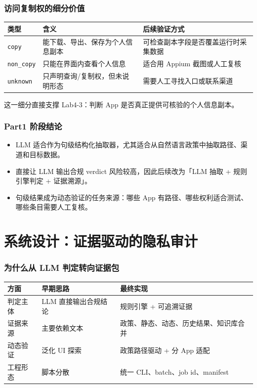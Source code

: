 \documentclass[AutoFakeBold,AutoFakeSlant]{beamer}
\newcommand{\code}[1]{\texttt{#1}}
\begin{document}
\begin{frame}
    \frametitle{访问复制权的细分价值}
    \small
    \begin{tabularx}{\textwidth}{|l|X|X|}
        \hline
        \textbf{类型} & \textbf{含义} & \textbf{后续验证方式} \\
        \hline
        \code{copy} & 能下载、导出、保存为个人信息副本 & 可检查副本字段是否覆盖运行时采集数据 \\
        \hline
        \code{non\_copy} & 只能在界面内查看个人信息 & 适合用 Appium 截图或人工复核 \\
        \hline
        \code{unknown} & 只声明查询/复制权，但未说明形态 & 需要人工寻找入口或联系渠道 \\
        \hline
    \end{tabularx}
    \vspace{0.6em}
    \scriptsize
    这一细分直接支撑 Lab4-3：判断 App 是否真正提供可核验的个人信息副本。
\end{frame}

\begin{frame}
    \frametitle{Part1 阶段结论}
    \small
    \begin{itemize}
        \item LLM 适合作为句级结构化抽取器，尤其适合从自然语言政策中抽取路径、渠道和目标数据。
        \item 直接让 LLM 输出合规 verdict 风险较高，因此后续改为「LLM 抽取 + 规则引擎判定 + 证据溯源」。
        \item 句级结果成为动态验证的任务来源：哪些 App 有路径、哪些权利适合测试、哪些条目需要人工复核。
    \end{itemize}
\end{frame}

\section{系统设计：证据驱动的隐私审计}

\begin{frame}
    \frametitle{为什么从 LLM 判定转向证据包}
    \small
    \begin{tabularx}{\textwidth}{|l|X|X|}
        \hline
        \textbf{方面} & \textbf{早期思路} & \textbf{最终实现} \\
        \hline
        判定主体 & LLM 直接输出合规结论 & 规则引擎 + 可追溯证据 \\
        \hline
        证据来源 & 主要依赖文本 & 政策、静态、动态、历史结果、知识库合并 \\
        \hline
        动态验证 & 泛化 UI 探索 & 政策路径驱动 + 分 App 适配 \\
        \hline
        工程形态 & 脚本分散 & 统一 CLI、batch、job id、manifest \\
        \hline
    \end{tabularx}
\end{frame}
\end{document}
